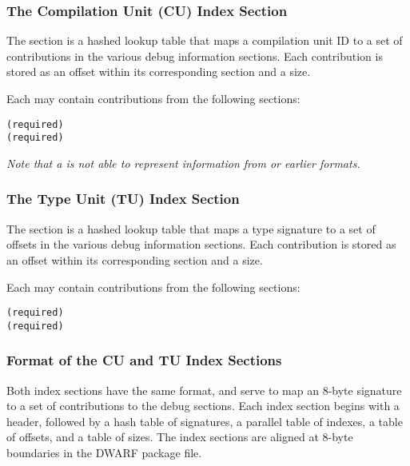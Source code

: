 \subsubsection{The Compilation Unit (CU) Index Section}
The \dotdebugcuindex{} section is a hashed lookup table that maps a
compilation unit ID to a set of contributions in the
various debug information sections. Each contribution is stored
as an offset within its corresponding section and a size.

Each \compunitset{} may contain contributions from the
following sections:
\begin{alltt}
    \dotdebuginfodwo{} (required)
    \dotdebugabbrevdwo{} (required)
    \dotdebuglinedwo
    \dotdebugloclistsdwo
    \dotdebugrnglistsdwo
    \dotdebugstroffsetsdwo
    \dotdebugmacrodwo
\end{alltt}

\textit{Note that a \compunitset{} is not able to represent \dotdebugmacinfo{}
information from \DWARFVersionIV{} or earlier formats.}

\subsubsection{The Type Unit (TU) Index Section}
The \dotdebugtuindex{} section is a hashed lookup table that maps a
type signature to a set of offsets in the various debug
information sections. Each contribution is stored as an offset
within its corresponding section and a size.

Each \typeunitset{} may contain contributions from the following
sections:
\begin{alltt}
    \dotdebuginfodwo{} (required) 
    \dotdebugabbrevdwo{} (required)
    \dotdebuglinedwo
    \dotdebugstroffsetsdwo
\end{alltt}

\subsubsection{Format of the CU and TU Index Sections}
Both index sections have the same format, and serve to map an
8-byte signature to a set of contributions to the debug sections.
Each index section begins with a header, followed by a hash table of
signatures, a parallel table of indexes, a table of offsets, and
a table of sizes. The index sections are aligned at 8-byte
boundaries in the DWARF package file.

